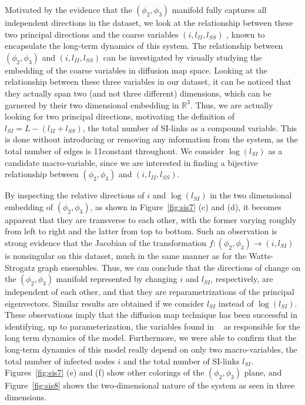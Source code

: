 Motivated by the evidence that the $(\phi_2 ,\phi_3)$ manifold fully
captures all independent directions in the dataset, we look at the
relationship between these two principal directions and the coarse
variables $(i, l_{II}, l_{SS})$ , known to encapsulate the long-term
dynamics of this system. The relationship between $(\phi_2 ,\phi_3)$
and $(i, l_{II}, l_{SS})$ can be investigated by visually studying the
embedding of the coarse variables in diffusion map space. Looking at
the relationship between these three variables in our dataset, it can
be noticed that they actually span two (and not three different)
dimensions, which can be garnered by their two dimensional embedding
in $\mathbb{R}^3$. Thus, we are actually looking for two principal
directions, motivating the definition of
$l_{SI} = L − (l_{II} + l_{SS})$, the total number of SI-links as a
compound variable. This is done without introducing or removing any
information from the system, as the total number of edges is
11constant throughout. We consider $\log(l_{SI})$ as a candidate
macro-variable, since we are interested in finding a bijective
relationship between $(\phi_2 ,\phi_3)$ and $(i, l_{II}, l_{SS})$.

By inspecting the relative directions of $i$ and $\log(l_{SI})$ in the
two dimensional embedding of $(\phi_2 ,\phi_3)$, as shown in
Figure~\ref{fig:sis7} (c) and (d), it becomes apparent that they are
transverse to each other, with the former varying roughly from left to
right and the latter from top to bottom. Such an observation is strong
evidence that the Jacobian of the transformation
$f:(\phi_2, \phi_3) \rightarrow (i, l_{SI})$ is nonsingular on this
dataset, much in the same manner as for the Watts-Strogatz graph
ensembles. Thus, we can conclude that the directions of change on the
$(\phi_2 ,\phi_3)$ manifold represented by changing $i$ and $l_{SI}$,
respectively, are independent of each other, and that they are
reparametrizations of the principal eigenvectors. Similar results are
obtained if we consider $l_{SI}$ instead of $\log(l_{SI})$. These
observations imply that the diffusion map technique has been
successful in identifying, up to parameterization, the variables found
in ~\cite{gross_robust_2008} as responsible for the long term dynamics
of the model. Furthermore, we were able to confirm that the long-term
dynamics of this model really depend on only two macro-variables, the
total number of infected nodes $i$ and the total number of SI-links
$l_{SI}$. Figures~\ref{fig:sis7} (e) and (f) show other colorings of
the $(\phi_2 ,\phi_3)$ plane, and Figure~\ref{fig:sis8} shows the
two-dimensional nature of the system as seen in three dimensions.

